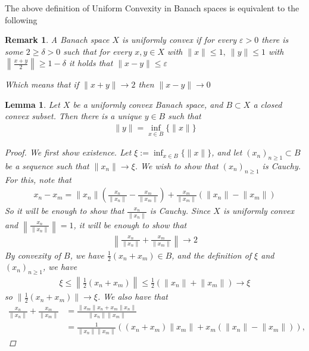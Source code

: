 \documentclass[10pt,twoside,openany,final]{memoir}
\theoremstyle{break}
\newtheorem{lemma}[section]{Lemma}
\theoremstyle{Break}
\newtheorem{remark}[section]{Remark}
\newcommand{\lv}{\lVert}
\newcommand{\rv}{\rVert}
\begin{document}
\noindent The above definition of Uniform Convexity in Banach spaces is equivalent to the following
\begin{remark}
A Banach space $X$ is uniformly convex if for every $\varepsilon>0$ there is some $2 \geq \delta >0$ such that for every $x,y \in X$ with $\lv x \rv \leq 1, \ \lv y \rv \leq 1$  with $\left \lv \frac{x+y}{2} \right\rv \geq 1 - \delta $ it holds that $\lv x-y \rv \leq \varepsilon$

\noindent Which means that if $\lv x+y \rv \to 2$ then $\lv x-y \rv \to 0$
\end{remark}

\begin{lemma} \label{rudin a}
Let $X$ be a uniformly convex Banach space, and $B \subset X$ a closed convex subset. Then there is a unique $y \in B$ such that
\begin{align*}
\lv y \rv = \inf_{x \in B} \{ \lv x \rv \}
\end{align*}
\begin{proof}
We first show existence. Let $\xi:= \inf_{x \in B} \{ \lv x \rv \}$, and let $(x_{n})_{n \geq 1} \subset B$ be a sequence such that $\lv x_{n} \rv \to \xi$. We wish to show that $(x_{n})_{n\geq 1}$ is Cauchy. For this, note that
\begin{align*}
x_{n}-x_{m}= \lv x_{n} \rv \left(\frac{x_{n}}{\lv x_{n} \rv} - \frac{x_{m}}{\lv x_{m}\rv} \right)+\frac{x_{m}}{\lv x_{m} \rv} (\lv x_{n} \rv - \lv x_{m} \rv)
\end{align*}
So it will be enough to show that $\frac{x_{n}}{\lv x_{n} \rv}$ is Cauchy. Since $X$ is uniformly convex and $\left\lv \frac{x_{n}}{\lv x_{n} \rv} \right \rv = 1$, it will be enough to show that 
\begin{align*}
 \left \lv \frac{x_{n}}{\lv x_{n} \rv} + \frac{x_{m}}{\lv x_{m}\rv} \right\rv \to 2
\end{align*}
By convexity of $B$, we have $\frac12 (x_{n}+x_{m}) \in B$, and the definition of $\xi$ and $(x_{n})_{n\geq 1}$, we have
\begin{align*}
\xi \leq \left\lv \frac12 (x_{n}+x_{m})\right\rv \leq \frac12 (\lv x_{n} \rv + \lv x_{m} \rv) \to \xi
\end{align*}
so $\lv \frac12 (x_{n}+x_{m})\rv \to \xi$. We also have that
\begin{align*}
\frac{x_{n}}{\lv x_{n}\rv} + \frac{x_{m}}{\lv x_{m}\rv}&= \frac{\lv x_{m}\rv x_{n}+ x_{m} \lv x_{n} \rv }{\lv x_{n}\rv \lv x_{m}\rv}\\
&=\frac{1}{\lv x_{n}\rv \lv x_{m}\rv} ( (x_{n}+x_{m})\lv x_{m} \rv + x_{m}(\lv x_{n} \rv - \lv x_{m}\rv)),

\end{align*}
\end{proof}
\end{lemma}
\end{document}
